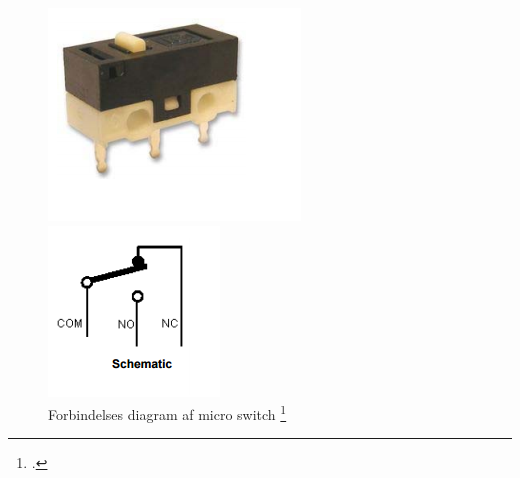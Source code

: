 \begin{figure}[H]
\centering
\begin{minipage}{.5\textwidth}
  \centering
  \includegraphics[width=\linewidth]{0_Filer/Figuer/5_HW_Design/Micro_switch.png}
  \caption{Micro Switch (DM1-01P-30-3) \footcite{DM1-01P-30-3}}
  \label{fig:HWD_Micro_switch}
\end{minipage}%
\begin{minipage}{.5\textwidth}
  \centering
  \includegraphics[width=\linewidth]{0_Filer/Figuer/5_HW_Design/Micro_switch_diagram.png}
  \caption{Forbindelses diagram af micro switch \footcite{DM1-01P-30-3}}
  \label{fig:HWD_Micro_Diagram}
\end{minipage}
\end{figure}

